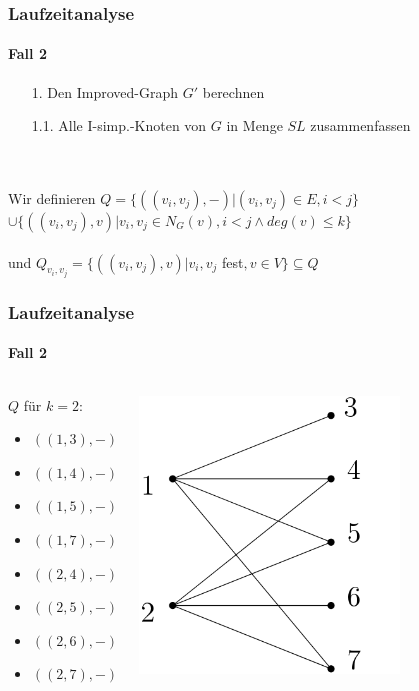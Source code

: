 
\begin{frame}
\frametitle{Laufzeitanalyse}
\framesubtitle{Fall 2}

\begin{enumerate}
	\item[1.] Den Improved-Graph $G'$ berechnen
	\item[1.1.] Alle I-simp.-Knoten von $G$ in Menge $SL$ zusammenfassen
\end{enumerate}
\ \\
\ \\

Wir definieren $Q = \{ ((v_i, v_j), - ) | (v_i, v_j) \in E, i < j \}$ \\
\hspace{2.86cm}$\cup \{ ((v_i, v_j), v) | v_i, v_j \in N_G(v), i < j \wedge deg(v) \leq k\}$ \\
\ \\
und $Q_{v_i,v_j} = \{ ((v_i, v_j), v) | v_i, v_j$ fest$, v \in V \} \subseteq Q$ \\



\end{frame}


\begin{frame}[t]
\frametitle{Laufzeitanalyse}
\framesubtitle{Fall 2}

\begin{columns}
	\begin{block}{$Q$ für $k=2$:}
		\begin{itemize}
			\item $((1,3), -)$
			\item $((1,4), -)$
			\item $((1,5), -)$
			\item $((1,7), -)$
			\item $((2,4), -)$
			\item $((2,5), -)$
			\item $((2,6), -)$
			\item $((2,7), -)$
		\end{itemize}
	\end{block}
	
	\includegraphics[width=0.7\textwidth]{images/Graph_Queue_1.png}
\end{columns}
\end{frame}

